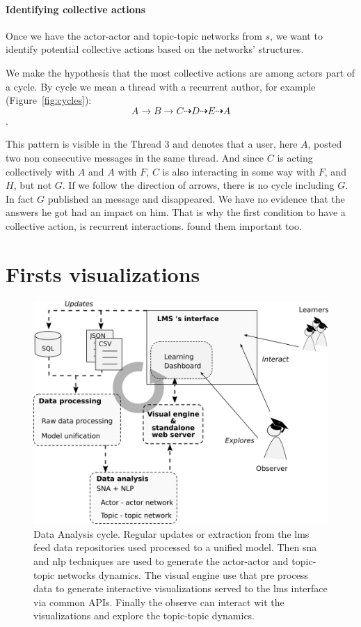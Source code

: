 \documentclass[a4paper,twoside]{article}
\begin{document}
\paragraph{Identifying collective actions}

Once we have the actor-actor and topic-topic networks from $s$,  we want to identify potential collective actions based on the networks' structures.

We make the hypothesis that the most collective actions are among actors part of a cycle.  By cycle we mean a thread with a recurrent author, for example (Figure~\ref{fig:cycles}): $$A \to B \to C  \dashrightarrow D  \dashrightarrow  E  \dashrightarrow A$$.

This pattern is visible in the Thread 3 and denotes that a user, here $A$, posted two non consecutive messages in the same thread.  And since $C$ is acting collectively with $A$ and $A$ with $F$, $C$ is also interacting in some way with $F$, and $H$, but not $G$.  If we follow the direction of arrows, there is no cycle including $G$.  In fact $G$ published an message and disappeared.  We have no evidence that the answers he got had an impact on him.  That is why the first condition to have a collective action, is recurrent interactions.  \cite{Chua2017} found them important too.


\section{Firsts visualizations}
\label{section:5}

\begin{figure}[b]
  \small{
    \caption{\label{fig:pipeline} Data Analysis cycle. Regular updates or extraction from the \gls{lms} feed data repositories used processed to a unified model.  Then \gls{sna} and \gls{nlp} techniques are used to generate the actor-actor and topic-topic networks dynamics.  The visual engine use that pre process data to generate interactive visualizations served to the \gls{lms} interface via common APIs.  Finally the observe can interact wit the visualizations and explore the topic-topic dynamics.
    }}
  \centering
  \includegraphics[width=.5\textwidth]{images/pipeline.png}
\end{figure}
\end{document}
